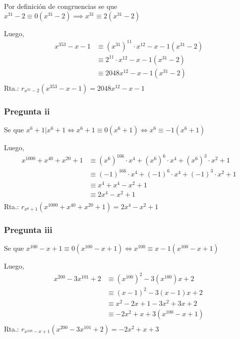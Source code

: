 Por definición de congruencias se que $ x^{31} - 2 \equiv 0(x^{31} - 2) \implies x^{31} \equiv 2(x^{31} - 2) $

Luego,
\begin{align*}
    x^{353} - x - 1 &\equiv (x^{31})^11 \cdot x^{12} - x - 1 (x^{31} - 2) \\
    &\equiv 2^11 \cdot x^{12} - x - 1 (x^{31} - 2) \\
    &\equiv 2048x^{12} - x - 1 (x^{31} - 2)\\
\end{align*}
Rta.: $ r_{x^{31} - 2}(x^{353} - x - 1) = 2048x^{12} - x - 1 $

\subsubsection{Pregunta ii}

Se que $ x^{6} + 1 | x^6 + 1 \iff x^6 + 1 \equiv 0 (x^6 + 1) \iff x^6 \equiv -1 (x^6 + 1) $

Luego,
\begin{align*}
    x^{1000} + x^{40} + x^{20} + 1 &\equiv (x^6)^{166} \cdot x^4 + (x^6)^6 \cdot x^4 + (x^6)^3 \cdot x^2 + 1 \\
    &\equiv (-1)^{166} \cdot x^4 + (-1)^6 \cdot x^4 + (-1)^3 \cdot x^2 + 1 \\
    &\equiv x^4 + x^4 - x^2 + 1 \\
    &\equiv 2x^4 - x^2 + 1 \\
\end{align*}
Rta.: $ r_{x^6 + 1}(x^{1000} + x^{40} + x^{20} + 1) = 2x^4 - x^2 + 1 $

\subsubsection{Pregunta iii}

Se que $ x^{100} - x + 1 \equiv 0 (x^{100} - x + 1) \iff x^{100} \equiv x-1(x^{100} -x + 1) $

Luego,
\begin{align*}
    x^{200} - 3x^{101} + 2 &\equiv (x^{100})^2 - 3(x^{100})x + 2 \\
    &\equiv (x-1)^2 - 3(x-1)x + 2 \\
    &\equiv x^2 - 2x + 1 - 3x^2 + 3x + 2 \\
    &\equiv -2x^2 + x + 3 (x^{100} -x + 1) \\
\end{align*}
Rta.: $ r_{x^{100} -x + 1}(x^{200} - 3x^{101} + 2) = -2x^2 + x + 3 $


